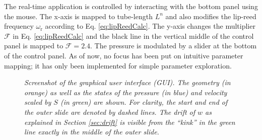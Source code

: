 The real-time application is controlled by interacting with the bottom panel using the mouse. The x-axis is mapped to tube-length $L^n$ and also modifies the lip-reed frequency $\omega_\text{r}$ according to Eq. \eqref{eq:lipReedCalc}. The y-axis changes the multiplier $\mathcal{F}$ in Eq. \eqref{eq:lipReedCalc} and the black line in the vertical middle of the control panel is mapped to $\mathcal{F} = 2.4$. The pressure is modulated by a slider at the bottom of the control panel. As of now, no focus has been put on intuitive parameter mapping; it has only been implemented for simple parameter exploration.

\begin{figure}[t]
    \centering
    \setlength{\fboxsep}{0pt} 
    \caption{\it Screenshot of the graphical user interface (GUI). The geometry (in orange) as well as the states of the pressure (in blue) and velocity scaled by $S$ (in green) are shown. For clarity, the start and end of the outer slide are denoted by dashed lines. The drift of $w$ as explained in Section \ref{sec:drift} is visible from the ``kink'' in the green line exactly in the middle of the outer slide.}
    \label{fig:GUI}
\end{figure}
